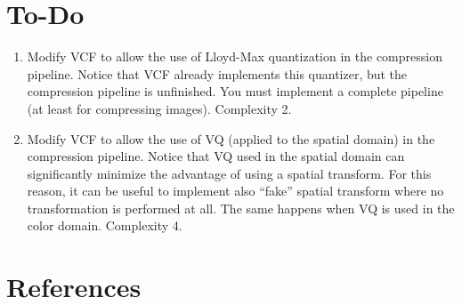 \section{To-Do}
\begin{enumerate}
\item Modify VCF to allow the use of Lloyd-Max quantization in the
  compression pipeline. Notice that VCF already implements this
  quantizer, but the compression pipeline is unfinished. You must
  implement a complete pipeline (at least for compressing
  images). Complexity 2.
\item Modify VCF to allow the use of VQ (applied to the spatial
  domain) in the compression pipeline. Notice that VQ used in the
  spatial domain can significantly minimize the advantage of using a
  spatial transform. For this reason, it can be useful to implement
  also ``fake'' spatial transform where no transformation is performed
  at all. The same happens when VQ is used in the color
  domain. Complexity 4.
\end{enumerate}

\section{References}

\renewcommand{\addcontentsline}[3]{}%

